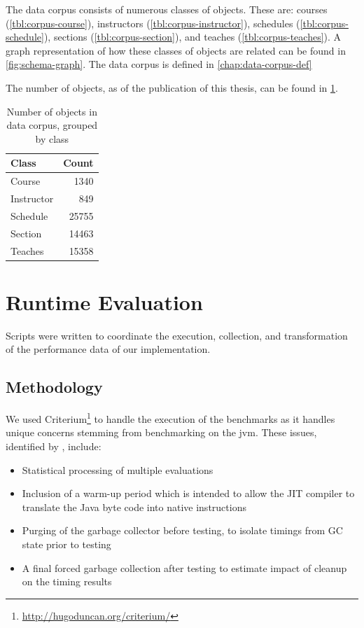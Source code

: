 		The data corpus consists of numerous classes of objects.  These are:  courses (\cref{tbl:corpus-course}), instructors (\cref{tbl:corpus-instructor}), schedules (\cref{tbl:corpus-schedule}), sections (\cref{tbl:corpus-section}), and teaches (\cref{tbl:corpus-teaches}).  A graph representation of how these classes of objects are related can be found in \cref{fig:schema-graph}.  The data corpus is defined in \cref{chap:data-corpus-def}
		
		The number of objects, as of the publication of this thesis, can be found in \cref{tbl:data-corpus-count}.
		
		\begin{table}
			\centering
			\begin{tabular}{lr}
			\toprule
			Class & Count \\
			\midrule
			Course & 1340 \\
			Instructor & 849 \\
			Schedule & 25755 \\
			Section & 14463 \\
			Teaches & 15358 \\
			\bottomrule
			\end{tabular}
			
			\caption{Number of objects in data corpus, grouped by class}
			\label{tbl:data-corpus-count}
		\end{table}
	
	\section{Runtime Evaluation}
	\label{sec:runtime-evaluation}
		Scripts were written to coordinate the execution, collection, and transformation of the performance data of our implementation.
		
		\subsection{Methodology}
			We used Criterium\footnote{\url{http://hugoduncan.org/criterium/}} to handle the execution of the benchmarks as it handles unique concerns stemming from benchmarking on the \gls{jvm}.  These issues, identified by \citeauthor{rob-java-bench-08} \cite{rob-java-bench-08}, include:
			
			\begin{itemize}
				\item Statistical processing of multiple evaluations
				\item Inclusion of a warm-up period which is intended to allow the JIT compiler to translate the Java byte code into native instructions
				\item Purging of the garbage collector before testing, to isolate timings from GC state prior to testing
				\item A final forced garbage collection after testing to estimate impact of cleanup on the timing results
			\end{itemize}
			

